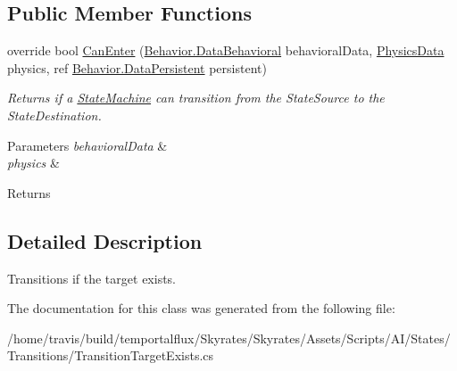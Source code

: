 \subsection*{Public Member Functions}
\begin{DoxyCompactItemize}
\item 
\hypertarget{class_skyrates_1_1_a_i_1_1_state_1_1_transition_1_1_transition_target_exists_a23dc7eee9df4de00fcfec275d7781b73}{override bool \hyperlink{class_skyrates_1_1_a_i_1_1_state_1_1_transition_1_1_transition_target_exists_a23dc7eee9df4de00fcfec275d7781b73}{Can\-Enter} (\hyperlink{class_skyrates_1_1_a_i_1_1_behavior_1_1_data_behavioral}{Behavior.\-Data\-Behavioral} behavioral\-Data, \hyperlink{class_skyrates_1_1_physics_1_1_physics_data}{Physics\-Data} physics, ref \hyperlink{class_skyrates_1_1_a_i_1_1_behavior_1_1_data_persistent}{Behavior.\-Data\-Persistent} persistent)}\label{class_skyrates_1_1_a_i_1_1_state_1_1_transition_1_1_transition_target_exists_a23dc7eee9df4de00fcfec275d7781b73}

\begin{DoxyCompactList}\small\item\em Returns if a \hyperlink{class_skyrates_1_1_a_i_1_1_state_1_1_state_machine}{State\-Machine} can transition from the State\-Source to the State\-Destination. 


\begin{DoxyParams}{Parameters}
{\em behavioral\-Data} & \\
\hline
{\em physics} & \\
\hline
\end{DoxyParams}
\begin{DoxyReturn}{Returns}

\end{DoxyReturn}
 \end{DoxyCompactList}\end{DoxyCompactItemize}


\subsection{Detailed Description}
Transitions if the target exists. 



The documentation for this class was generated from the following file\-:\begin{DoxyCompactItemize}
\item 
/home/travis/build/temportalflux/\-Skyrates/\-Skyrates/\-Assets/\-Scripts/\-A\-I/\-States/\-Transitions/Transition\-Target\-Exists.\-cs\end{DoxyCompactItemize}
